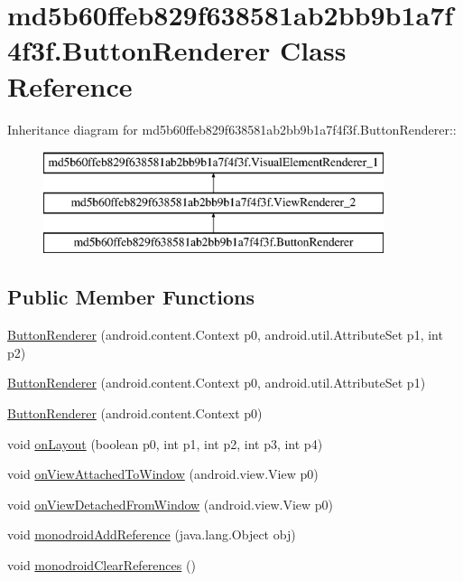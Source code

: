 \hypertarget{classmd5b60ffeb829f638581ab2bb9b1a7f4f3f_1_1_button_renderer}{
\section{md5b60ffeb829f638581ab2bb9b1a7f4f3f.ButtonRenderer Class Reference}
\label{classmd5b60ffeb829f638581ab2bb9b1a7f4f3f_1_1_button_renderer}
}
Inheritance diagram for md5b60ffeb829f638581ab2bb9b1a7f4f3f.ButtonRenderer::\begin{figure}[H]
\begin{center}
\leavevmode
\includegraphics[height=3cm]{classmd5b60ffeb829f638581ab2bb9b1a7f4f3f_1_1_button_renderer}
\end{center}
\end{figure}
\subsection*{Public Member Functions}
\begin{CompactItemize}
\item 
\hyperlink{classmd5b60ffeb829f638581ab2bb9b1a7f4f3f_1_1_button_renderer_44933cd78b3f547dc6c6282043506ae5}{ButtonRenderer} (android.content.Context p0, android.util.AttributeSet p1, int p2)
\item 
\hyperlink{classmd5b60ffeb829f638581ab2bb9b1a7f4f3f_1_1_button_renderer_e0d491f966e2aef899b84d42c9d2ae43}{ButtonRenderer} (android.content.Context p0, android.util.AttributeSet p1)
\item 
\hyperlink{classmd5b60ffeb829f638581ab2bb9b1a7f4f3f_1_1_button_renderer_ef5f692cbf4180a0d0683aaaec08d3ae}{ButtonRenderer} (android.content.Context p0)
\item 
void \hyperlink{classmd5b60ffeb829f638581ab2bb9b1a7f4f3f_1_1_button_renderer_32dc12b457387df026545663655ce4b2}{onLayout} (boolean p0, int p1, int p2, int p3, int p4)
\item 
void \hyperlink{classmd5b60ffeb829f638581ab2bb9b1a7f4f3f_1_1_button_renderer_545cf2b3c92707d187a93a08903f63ec}{onViewAttachedToWindow} (android.view.View p0)
\item 
void \hyperlink{classmd5b60ffeb829f638581ab2bb9b1a7f4f3f_1_1_button_renderer_ebd2e3c0410f099a12739d53789de61b}{onViewDetachedFromWindow} (android.view.View p0)
\item 
void \hyperlink{classmd5b60ffeb829f638581ab2bb9b1a7f4f3f_1_1_button_renderer_64b38ed3e683851f4be2246223c6cab5}{monodroidAddReference} (java.lang.Object obj)
\item 
void \hyperlink{classmd5b60ffeb829f638581ab2bb9b1a7f4f3f_1_1_button_renderer_95654f418661c12f44eaabf4ec84d2d0}{monodroidClearReferences} ()
\end{CompactItemize}
